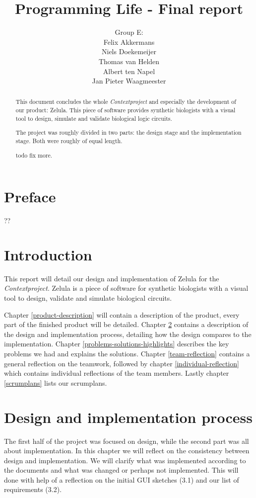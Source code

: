 \documentclass[a4paper]{article}
\title{Programming Life - Final report}
\author{Group E:\\
Felix Akkermans \\
Niels Doekemeijer \\
Thomas van Helden \\
Albert ten Napel \\
Jan Pieter Waagmeester}
\begin{document}
\maketitle
\thispagestyle{empty}
\vfill

\small{\tableofcontents}
\pagebreak{}

\section*{Preface} ??


\pagebreak
\begin{abstract}
\noindent This document concludes the whole \textit{Contextproject} and especially the development of our product: Zelula. This piece of software provides synthetic biologists with a visual tool to design, simulate and validate biological logic circuits.

The project was roughly divided in two parts: the design stage and the implementation stage. Both were roughly of equal length.

todo fix more.
\end{abstract}
\pagebreak

\section{Introduction}
This report will detail our design and implementation of Zelula for the \textit{Contextproject}. Zelula is a piece of software for synthetic biologists with a visual tool to design, validate and simulate biological circuits.

Chapter \ref{product-description} will contain a description of the product, every part of the finished product will be detailed. Chapter \ref{design-implementation} contains a description of the design and implementation process, detailing how the design compares to the implementation. Chapter \ref{problems-solutions-highlights} describes the key problems we had and explains the solutions. Chapter \ref{team-reflection} contains a general reflection on the teamwork, followed by chapter \ref{individual-reflection} which contains individual reflections of the team members. Lastly chapter \ref{scrumplans} lists our scrumplans.



\section{Design and implementation process}
\label{design-implementation}
The first half of the project was focused on design, while the second part was all about implementation. In this chapter we will reflect on the consistency between design and implementation. We will clarify what was implemented according to the documents and what was changed or perhaps not implemented. This will done with help of a reflection on the initial GUI sketches (3.1) and our list of requirements (3.2).
\end{document}
